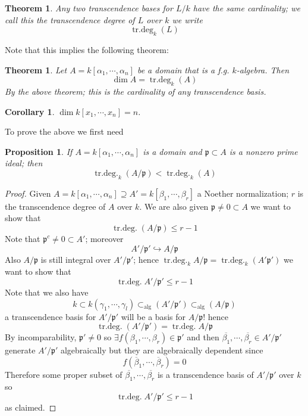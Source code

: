 \documentclass[11pt,a4paper]{article}
\theoremstyle{definition}
\theoremstyle{plain}
\newtheorem{theorem}[definition]{Theorem}
\newtheorem{proposition}[definition]{Proposition}
\newtheorem{corollary}[definition]{Corollary}
\theoremstyle{remark}
\begin{document}
\begin{theorem}
    Any two transcendence bases for $L/k$ have the same cardinality; we call this the transcendence degree of $L$ over $k$ we write 
    $$\operatorname{tr.deg}_k (L)$$
\end{theorem}

Note that this implies the following theorem:
\begin{theorem}
    Let $A =k[\alpha_1, \cdots, \alpha_n]$ be a domain that is a f.g. $k$-algebra. Then 
    $$\dim A = \operatorname{tr.deg}_k (A)$$
    By the above theorem; this is the cardinality of any transcendence basis. 
\end{theorem}

\begin{corollary}
    $\dim k[x_1, \cdots, x_n] = n$.
\end{corollary}

To prove the above we first need 
\begin{proposition}
    If $A = k[\alpha_1, \cdots, \alpha_n]$ is a domain and $\mathfrak{p} \subset A$ is a nonzero prime ideal; then 
    $$\operatorname{tr.deg.}_k (A/\mathfrak{p}) < \operatorname{tr.deg.}_k (A)$$
\end{proposition}

\begin{proof}
    Given $A = k[\alpha_1, \cdots, \alpha_n] \supseteq A' = k[\beta_1, \cdots, \beta_r]$ a Noether normalization; $r$ is the transcendence 
    degree of $A$ over $k$. We are also given $\mathfrak{p} \ne 0 \subset A$ we want to show that 
    $$\operatorname{tr.deg.} (A/\mathfrak{p}) \le r-1$$
    Note that $\mathfrak{p}^c \ne 0 \subset A'$; moreover 
    $$A'/\mathfrak{p}' \hookrightarrow A/\mathfrak{p}$$
    Also $A/\mathfrak{p}$ is still integral over $A'/\mathfrak{p}'$; hence $\operatorname{tr.deg.}_k A/\mathfrak{p} = \operatorname{tr.deg.}_k (A'\mathfrak{p}')$
    we want to show that 
    $$\operatorname{tr.deg.} A'/\mathfrak{p}' \le r-1$$
    Note that we also have 
    $$k \subset k(\gamma_1, \cdots, \gamma_l) \subset_{\text{alg}} (A'/\mathfrak{p}') \subset_{\text{alg}} (A/\mathfrak{p})$$
    a transcendence basis for $A'/\mathfrak{p}'$ will be a basis for $A/\mathfrak{p}$! hence 
    $$\operatorname{tr.deg.} (A'/\mathfrak{p}') = \operatorname{tr.deg.} A/\mathfrak{p}$$
    By incomparability, $\mathfrak{p}' \ne 0$ so $\exists f(\beta_1, \cdots, \beta_r) \in \mathfrak{p}'$ and then 
    $\overline{\beta_1}, \cdots, \overline{\beta_r} \in A'/\mathfrak{p}'$ generate $A'/\mathfrak{p}'$ algebraically but they are algebraically 
    dependent since 
    $$f(\overline{\beta}_1, \cdots, \overline{\beta}_r) = 0$$
    Therefore some proper subset of $\overline{\beta_1}, \cdots, \overline{\beta_r}$ is a transcendence basis of $A'/\mathfrak{p}'$ over $k$ so 
    $$\operatorname{tr.deg.} A'/\mathfrak{p}' \le r-1$$
    as claimed.  
\end{proof}
\end{document}
